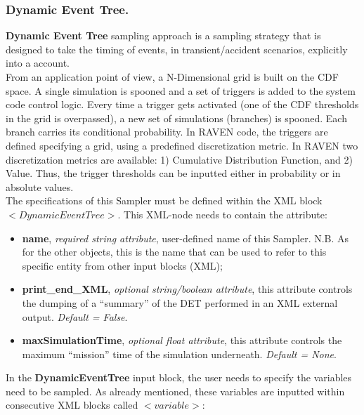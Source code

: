\subsubsection{Dynamic Event Tree.}
\label{subsubsubsec:DET}
\textbf{Dynamic Event Tree} sampling approach is a sampling strategy that is designed to take the timing of events, in transient/accident scenarios, explicitly into a account.
\\ From an application point of view, a N-Dimensional grid is built on the CDF space. A single simulation is spooned and a set of triggers is added to the system code control logic. Every time a trigger gets activated (one of the CDF thresholds in the grid is overpassed), a new set of simulations (branches) is spooned. Each branch carries its conditional probability. In RAVEN code, the triggers are defined specifying a grid, using a predefined discretization metric.
In RAVEN two discretization metrics are available: 1) Cumulative Distribution Function, and 2) Value. Thus, the trigger thresholds can be inputted either in probability or in absolute values.
\\ The specifications of this Sampler must be defined within the XML block $<DynamicEventTree>$. This XML-node needs to contain the attribute:
\begin{itemize}
\itemsep0em
\item \textbf{name}, \textit{required string attribute}, user-defined name of this Sampler. N.B. As for the other objects, this is the name that can be used to refer to this specific entity from other input blocks (XML);
\item \textbf{print\_end\_XML}, \textit{optional string/boolean attribute}, this attribute controls the dumping of a ``summary'' of the DET performed in an XML external output. \textit{Default = False}.
\item \textbf{maxSimulationTime}, \textit{optional float attribute}, this attribute controls the maximum ``mission'' time of the simulation underneath. \textit{Default = None}.
\end{itemize}
In the \textbf{DynamicEventTree} input block, the user needs to specify the variables need to be sampled. As already mentioned, these variables are inputted within consecutive XML blocks called $<variable>$:
